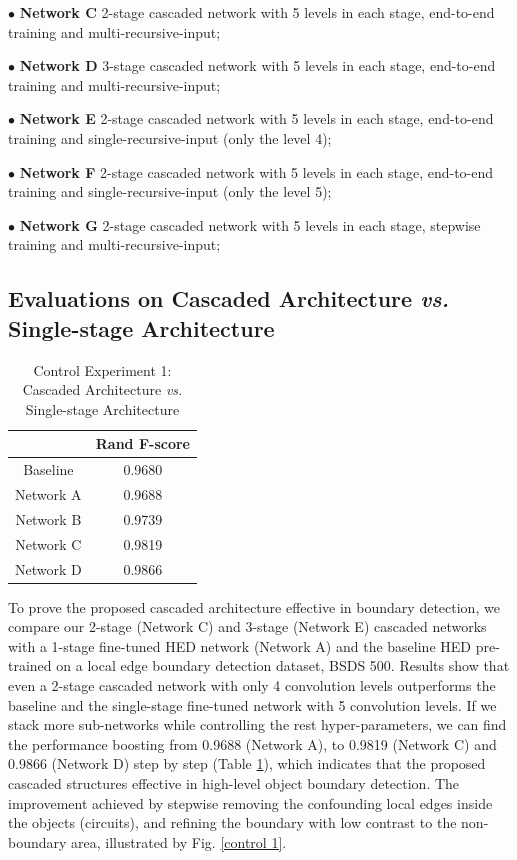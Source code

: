 \documentclass[senior]{IPSstyle}
\begin{document}
$\bullet$ \textbf{Network C} 2-stage cascaded network with 5 levels in each stage, end-to-end training and multi-recursive-input;

$\bullet$ \textbf{Network D} 3-stage cascaded network with 5 levels in each stage, end-to-end training and multi-recursive-input;

$\bullet$ \textbf{Network E} 2-stage cascaded network with 5 levels in each stage, end-to-end training and single-recursive-input (only the level 4);

$\bullet$ \textbf{Network F} 2-stage cascaded network with 5 levels in each stage, end-to-end training and single-recursive-input (only the level 5);

$\bullet$ \textbf{Network G} 2-stage cascaded network with 5 levels in each stage, stepwise training and multi-recursive-input;


\subsection{Evaluations on Cascaded Architecture \emph{vs.} Single-stage Architecture}

\begin{table}[t]
\renewcommand{\arraystretch}{0.6}
\caption{Control Experiment 1: Cascaded Architecture \emph{vs.} Single-stage Architecture}
\label{outcome}
\begin{center}
\begin{tabular}{|c|c|}
\hline
&\multicolumn{1}{c|}{Rand F-score}\\
\hline
Baseline 			& 0.9680	\\	\hline
Network A 		& 0.9688 	\\	\hline
Network B			& 0.9739	 \\	\hline
Network C 		& 0.9819	\\	\hline
Network D 		& 0.9866	\\	\hline
\end{tabular}
\end{center}
\label{control experiment 1}
\end{table}

To prove the proposed cascaded architecture effective in boundary detection, we compare our 2-stage (Network C) and 3-stage (Network E) cascaded networks with a 1-stage fine-tuned HED\cite{Xie2015} network (Network A) and the baseline HED\cite{Xie2015} pre-trained on a local edge boundary detection dataset, BSDS 500\cite{Arbelaez2011}. Results show that even a 2-stage cascaded network with only 4 convolution levels outperforms the baseline and the single-stage fine-tuned network with 5 convolution levels. If we stack more sub-networks while controlling the rest hyper-parameters, we can find the performance boosting from 0.9688 (Network A), to 0.9819 (Network C) and 0.9866 (Network D) step by step (Table \ref{control experiment 1}), which indicates that the proposed cascaded structures effective in high-level object boundary detection. The improvement achieved by stepwise removing the confounding local edges inside the objects (circuits), and refining the boundary with low contrast to the non-boundary area, illustrated by Fig. \ref{control 1}.
\end{document}
